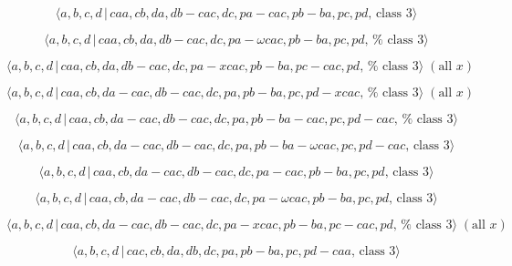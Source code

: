 \documentclass[10pt]{article}
\begin{document}
\begin{equation}
\langle a,b,c,d\,|\,caa,cb,da,db-cac,dc,pa-cac,pb-ba,pc,pd,\,\text{class }%
3\rangle  \tag{7.3890}
\end{equation}

\begin{equation}
\langle a,b,c,d\,|\,caa,cb,da,db-cac,dc,pa-\omega cac,pb-ba,pc,pd,\,\text{%
class }3\rangle  \tag{7.3891}
\end{equation}

\begin{equation}
\langle a,b,c,d\,|\,caa,cb,da,db-cac,dc,pa-xcac,pb-ba,pc-cac,pd,\,\text{%
class }3\rangle \;(\text{all }x)  \tag{7.3892}
\end{equation}

\begin{equation}
\langle a,b,c,d\,|\,caa,cb,da-cac,db-cac,dc,pa,pb-ba,pc,pd-xcac,\,\text{%
class }3\rangle \;(\text{all }x)  \tag{7.3893}
\end{equation}

\begin{equation}
\langle a,b,c,d\,|\,caa,cb,da-cac,db-cac,dc,pa,pb-ba-cac,pc,pd-cac,\,\text{%
class }3\rangle  \tag{7.3894}
\end{equation}

\begin{equation}
\langle a,b,c,d\,|\,caa,cb,da-cac,db-cac,dc,pa,pb-ba-\omega cac,pc,pd-cac,\,%
\text{class }3\rangle  \tag{7.3895}
\end{equation}

\begin{equation}
\langle a,b,c,d\,|\,caa,cb,da-cac,db-cac,dc,pa-cac,pb-ba,pc,pd,\,\text{class 
}3\rangle  \tag{7.3896}
\end{equation}

\begin{equation}
\langle a,b,c,d\,|\,caa,cb,da-cac,db-cac,dc,pa-\omega cac,pb-ba,pc,pd,\,%
\text{class }3\rangle  \tag{7.3897}
\end{equation}

\begin{equation}
\langle a,b,c,d\,|\,caa,cb,da-cac,db-cac,dc,pa-xcac,pb-ba,pc-cac,pd,\,\text{%
class }3\rangle \;(\text{all }x)  \tag{7.3898}
\end{equation}

\begin{equation}
\langle a,b,c,d\,|\,cac,cb,da,db,dc,pa,pb-ba,pc,pd-caa,\,\text{class }%
3\rangle  \tag{7.3899}
\end{equation}
\end{document}
